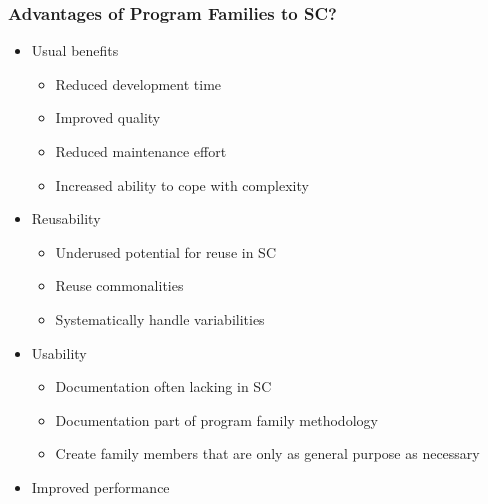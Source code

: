\documentclass[t,12pt,numbers,fleqn]{beamer}
\begin{document}
\begin{frame}

\frametitle{Advantages of Program Families to SC?}

\begin{itemize}
\item Usual benefits
\begin{itemize}
\item Reduced development time
\item Improved quality
\item Reduced maintenance effort
\item Increased ability to cope with complexity
\end{itemize}
\item Reusability
\begin{itemize}
\item Underused potential for reuse in SC
\item Reuse commonalities
\item Systematically handle variabilities
\end{itemize}
\item Usability
\begin{itemize}
\item Documentation often lacking in SC
\item Documentation part of program family methodology
\item Create family members that are only as general purpose as necessary
\end{itemize}
\item Improved performance
\end{itemize}

\end{frame}

\end{document}
